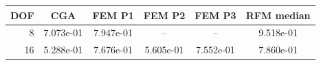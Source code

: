 \begin{tabular}{rccccc}
\toprule
DOF & CGA & FEM P1 & FEM P2 & FEM P3 & RFM median \\
\midrule
8 & 7.073e-01 & 7.947e-01 & -- & -- & 9.518e-01 \\
16 & 5.288e-01 & 7.676e-01 & 5.605e-01 & 7.552e-01 & 7.860e-01 \\
\bottomrule
\end{tabular}
